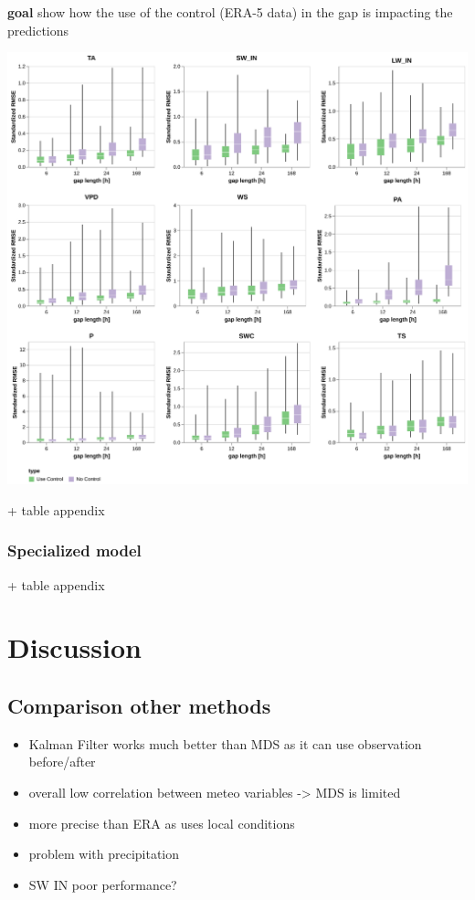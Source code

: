 \documentclass{article}
\let\Oldsection\section
\renewcommand{\section}{\FloatBarrier\Oldsection}
\let\Oldsubsection\subsection
\renewcommand{\subsection}{\FloatBarrier\Oldsubsection}
\let\Oldsubsubsection\subsubsection
\renewcommand{\subsubsection}{\FloatBarrier\Oldsubsubsection}
\begin{document}
\textbf{goal} show how the use of the control (ERA-5 data) in the gap is impacting the predictions

\includegraphics[width=\textwidth]{use_control}

+ table appendix


\subsubsection{Specialized model}


+ table appendix


\section{Discussion}

\subsection{Comparison other methods}

\begin{itemize}
    \item Kalman Filter works much better than MDS as it can use observation before/after
    \item overall low correlation between meteo variables -> MDS is limited
    \item more precise than ERA as uses local conditions
    \item problem with precipitation
    \item SW IN poor performance?
\end{itemize}
\end{document}
